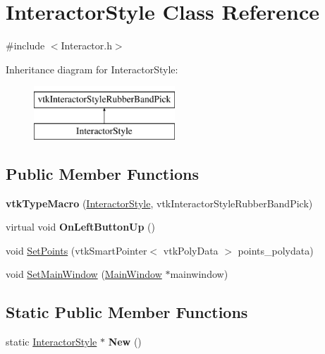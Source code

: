 \hypertarget{class_interactor_style}{}\section{Interactor\+Style Class Reference}
\label{class_interactor_style}


{\ttfamily \#include $<$Interactor.\+h$>$}

Inheritance diagram for Interactor\+Style\+:\begin{figure}[H]
\begin{center}
\leavevmode
\includegraphics[height=2.000000cm]{class_interactor_style}
\end{center}
\end{figure}
\subsection*{Public Member Functions}
\begin{DoxyCompactItemize}
\item 
{\bfseries vtk\+Type\+Macro} (\hyperlink{class_interactor_style}{Interactor\+Style}, vtk\+Interactor\+Style\+Rubber\+Band\+Pick)\hypertarget{class_interactor_style_a43338f1434b768677a2feac0b1a05c13}{}\label{class_interactor_style_a43338f1434b768677a2feac0b1a05c13}

\item 
virtual void {\bfseries On\+Left\+Button\+Up} ()\hypertarget{class_interactor_style_a441fa7b70b39c61768f0d9a8d48faf3c}{}\label{class_interactor_style_a441fa7b70b39c61768f0d9a8d48faf3c}

\item 
void \hyperlink{class_interactor_style_aca72fd8ef4db10f2356795ae9cf32d9b}{Set\+Points} (vtk\+Smart\+Pointer$<$ vtk\+Poly\+Data $>$ points\+\_\+polydata)
\item 
void \hyperlink{class_interactor_style_aa7d59db5ac179da9469081c14e77b6d0}{Set\+Main\+Window} (\hyperlink{class_main_window}{Main\+Window} $\ast$mainwindow)
\end{DoxyCompactItemize}
\subsection*{Static Public Member Functions}
\begin{DoxyCompactItemize}
\item 
static \hyperlink{class_interactor_style}{Interactor\+Style} $\ast$ {\bfseries New} ()\hypertarget{class_interactor_style_aaea3b0cff00feb99c42325bf49168fc6}{}\label{class_interactor_style_aaea3b0cff00feb99c42325bf49168fc6}

\end{DoxyCompactItemize}


